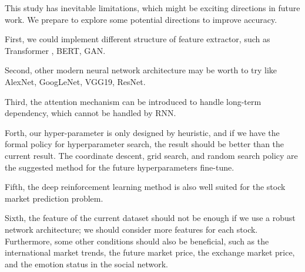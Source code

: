 \documentclass{article}
\begin{document}
This study has inevitable limitations, which might be exciting directions in future work. We prepare to explore some potential directions to improve accuracy.

First, we could implement different structure of feature extractor, such as Transformer \citep{DBLP:journals/corr/JaderbergSZK15}, BERT\citep{DBLP:journals/corr/abs-1810-04805}, GAN\citep{DBLP:conf/nips/KrizhevskySH12}.

Second, other modern neural network architecture may be worth to try like AlexNet\citep{DBLP:journals/corr/abs-1710-07035}, GoogLeNet\citep{DBLP:journals/corr/SzegedyLJSRAEVR14}, VGG19\citep{simonyan2017very}, ResNet\citep{DBLP:journals/corr/HeZRS15}.

Third, the attention mechanism \citep{DBLP:journals/access/LiuW19} can be introduced to handle long-term dependency, which cannot be handled by RNN.

Forth, our hyper-parameter is only designed by heuristic, and if we have the formal policy for hyperparameter search, the result should be better than the current result. The coordinate descent, grid search, and random search policy are the suggested method for the future hyperparameters fine-tune.

Fifth, the deep reinforcement learning method is also well suited for the stock market prediction problem.

Sixth, the feature of the current dataset should not be enough if we use a robust network architecture; we should consider more features for each stock. Furthermore, some other conditions should also be beneficial, such as the international market trends, the future market price, the exchange market price, and the emotion status in the social network.



\newpage
\appendix
 
%
\end{document}
